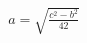 \documentclass[preview]{standalone}
\begin{document}
\begin{align*}
a = \sqrt{\frac{c^2 - b^2}{42}}
\end{align*}
\end{document}
